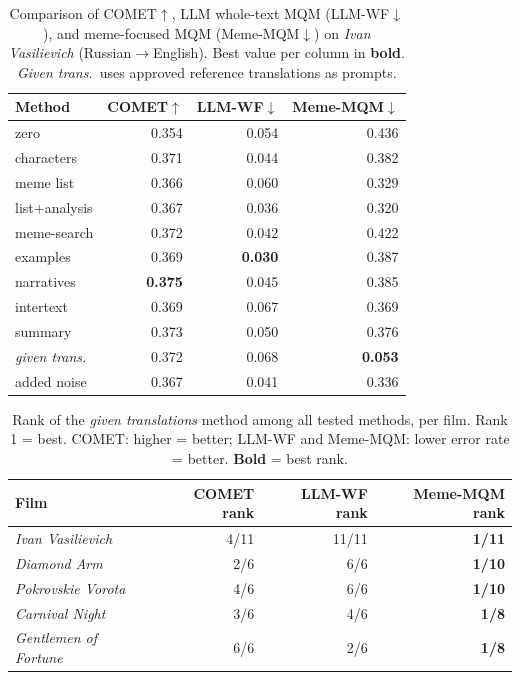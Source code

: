 \begin{table}[t]
\centering
\small
\begin{tabular}{lrrr}
\toprule
\textbf{Method} & \textbf{COMET}$\uparrow$ & \textbf{LLM-WF}$\downarrow$ & \textbf{Meme-MQM}$\downarrow$ \\
\midrule
zero & 0.354 & 0.054 & 0.436 \\
characters & 0.371 & 0.044 & 0.382 \\
meme list & 0.366 & 0.060 & 0.329 \\
list+analysis & 0.367 & 0.036 & 0.320 \\
meme-search & 0.372 & 0.042 & 0.422 \\
examples & 0.369 & \textbf{0.030} & 0.387 \\
narratives & \textbf{0.375} & 0.045 & 0.385 \\
intertext & 0.369 & 0.067 & 0.369 \\
summary & 0.373 & 0.050 & 0.376 \\
\midrule
\textit{given trans.} & 0.372 & 0.068 & \textbf{0.053} \\
added noise & 0.367 & 0.041 & 0.336 \\
\bottomrule
\end{tabular}
\caption{Comparison of COMET$\uparrow$, LLM whole-text MQM (LLM-WF$\downarrow$), and meme-focused MQM (Meme-MQM$\downarrow$) on \textit{Ivan Vasilievich} (Russian$\to$English). Best value per column in \textbf{bold}. \textit{Given trans.}\ uses approved reference translations as prompts.}
\label{tab:metrics-comparison-ivan-vas}
\end{table}

\begin{table}[t]
\centering
\small
\begin{tabular}{lrrr}
\toprule
\textbf{Film} & \textbf{COMET rank} & \textbf{LLM-WF rank} & \textbf{Meme-MQM rank} \\
\midrule
\textit{Ivan Vasilievich} & 4/11 & 11/11 & \textbf{1/11} \\
\textit{Diamond Arm} & 2/6 & 6/6 & \textbf{1/10} \\
\textit{Pokrovskie Vorota} & 4/6 & 6/6 & \textbf{1/10} \\
\textit{Carnival Night} & 3/6 & 4/6 & \textbf{1/8} \\
\textit{Gentlemen of Fortune} & 6/6 & 2/6 & \textbf{1/8} \\
\bottomrule
\end{tabular}
\caption{Rank of the \textit{given translations} method among all tested methods, per film. Rank 1 = best. COMET: higher = better; LLM-WF and Meme-MQM: lower error rate = better. \textbf{Bold} = best rank.}
\label{tab:given-ranks}
\end{table}

